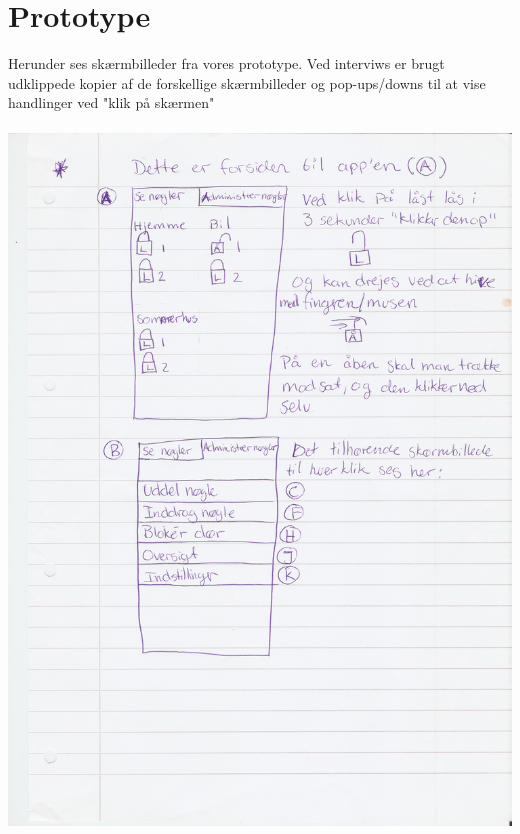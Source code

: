 \documentclass[a4paper,12pt]{article}
\begin{document}
\section{Prototype}

Herunder ses skærmbilleder fra vores prototype. Ved interviws er brugt udklippede kopier af de forskellige skærmbilleder og pop-ups/downs til at vise handlinger ved "klik på skærmen"
\\ \\
\includegraphics[width=\textwidth]{proto/AB.jpg}
\end{document}
